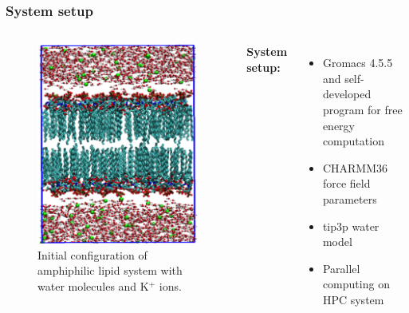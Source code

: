 \documentclass{beamer}
\begin{document}
\begin{frame}
\frametitle{System setup}
\begin{columns}
		\begin{figure}
			\includegraphics[width=\columnwidth]{Pics/Lipid_setup.png}
			\caption{Initial configuration of amphiphilic lipid system with water molecules and K$^+$ ions.}
		\end{figure}
		{\bf System setup:}
		\begin{itemize}
			\item Gromacs 4.5.5 and self-developed program for free energy computation
			\item CHARMM36 force field parameters
			\item tip3p water model
			\item Parallel computing on HPC system
		\end{itemize}
\end{columns}
\end{frame}
\end{document}
